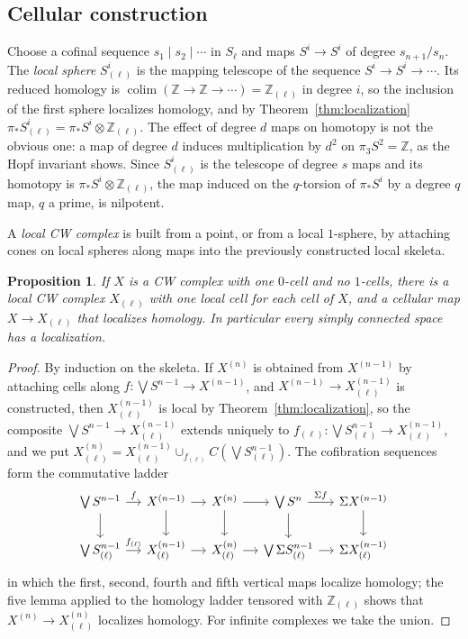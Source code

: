 \documentclass[11pt]{amsart}
\theoremstyle{plain}
\newtheorem{proposition}[theorem]{Proposition}
\theoremstyle{definition}
\numberwithin{equation}{section}
\newcommand{\Z}{\mathbb{Z}}
\newcommand{\Zl}{\mathbb{Z}_{(\ell)}}
\DeclareMathOperator{\colim}{colim}
\begin{document}
\subsection{Cellular construction}
Choose a cofinal sequence $s_1\mid s_2\mid\cdots$ in $S_\ell$ and maps $S^i\to S^i$ of degree $s_{n+1}/s_n$.
The \emph{local sphere} $S^i_{(\ell)}$ is the mapping telescope of the sequence $S^i\to S^i\to\cdots$.
Its reduced homology is $\colim(\Z\to\Z\to\cdots)=\Zl$ in degree $i$, so the inclusion of the first sphere localizes homology, and by Theorem~\ref{thm:localization} $\pi_*S^i_{(\ell)}=\pi_*S^i\otimes\Zl$.
The effect of degree $d$ maps on homotopy is not the obvious one: a map of degree $d$ induces multiplication by $d^2$ on $\pi_3S^2=\Z$, as the Hopf invariant shows.
Since $S^i_{(\ell)}$ is the telescope of degree $s$ maps and its homotopy is $\pi_*S^i\otimes\Zl$, the map induced on the $q$-torsion of $\pi_*S^i$ by a degree $q$ map, $q$ a prime, is nilpotent.

A \emph{local CW complex} is built from a point, or from a local $1$-sphere, by attaching cones on local spheres along maps into the previously constructed local skeleta.

\begin{proposition}\label{prop:cellularloc}
If $X$ is a CW complex with one $0$-cell and no $1$-cells, there is a local CW complex $X_{(\ell)}$ with one local cell for each cell of $X$, and a cellular map $X\to X_{(\ell)}$ that localizes homology.
In particular every simply connected space has a localization.
\end{proposition}

\begin{proof}
By induction on the skeleta.
If $X^{(n)}$ is obtained from $X^{(n-1)}$ by attaching cells along $f\colon\bigvee S^{n-1}\to X^{(n-1)}$, and $X^{(n-1)}\to X^{(n-1)}_{(\ell)}$ is constructed, then $X^{(n-1)}_{(\ell)}$ is local by Theorem~\ref{thm:localization}, so the composite $\bigvee S^{n-1}\to X^{(n-1)}_{(\ell)}$ extends uniquely to $f_{(\ell)}\colon\bigvee S^{n-1}_{(\ell)}\to X^{(n-1)}_{(\ell)}$, and we put $X^{(n)}_{(\ell)}=X^{(n-1)}_{(\ell)}\cup_{f_{(\ell)}}C(\bigvee S^{n-1}_{(\ell)})$.
The cofibration sequences form the commutative ladder
\[
\begin{tikzcd}[column sep=small]
\bigvee S^{n-1}\arrow[r,"f"]\arrow[d] & X^{(n-1)}\arrow[r]\arrow[d] & X^{(n)}\arrow[r]\arrow[d] & \bigvee S^n\arrow[r,"\Sigma f"]\arrow[d] & \Sigma X^{(n-1)}\arrow[d]\\
\bigvee S^{n-1}_{(\ell)}\arrow[r,"f_{(\ell)}"] & X^{(n-1)}_{(\ell)}\arrow[r] & X^{(n)}_{(\ell)}\arrow[r] & \bigvee \Sigma S^{n-1}_{(\ell)}\arrow[r] & \Sigma X^{(n-1)}_{(\ell)}
\end{tikzcd}
\]
in which the first, second, fourth and fifth vertical maps localize homology; the five lemma applied to the homology ladder tensored with $\Zl$ shows that $X^{(n)}\to X^{(n)}_{(\ell)}$ localizes homology.
For infinite complexes we take the union.
\end{proof}
\end{document}
